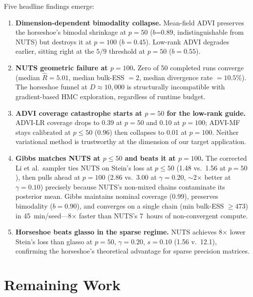 \documentclass[10pt,conference,compsoc]{IEEEtran}
\begin{document}
Five headline findings emerge:

\begin{enumerate}[leftmargin=*]
  \item \textbf{Dimension-dependent bimodality collapse.} Mean-field ADVI preserves the horseshoe's bimodal shrinkage at $p{=}50$ ($b$=$0.89$, indistinguishable from NUTS) but destroys it at $p{=}100$ ($b = 0.45$). Low-rank ADVI degrades earlier, sitting right at the $5/9$ threshold at $p{=}50$ ($b = 0.55$).

  \item \textbf{NUTS geometric failure at $p{=}100$.} Zero of 50 completed runs converge (median $\hat{R} = 5.01$, median bulk-ESS $= 2$, median divergence rate $= 10.5\%$). The horseshoe funnel at $D \approx 10{,}000$ is structurally incompatible with gradient-based HMC exploration, regardless of runtime budget.

  \item \textbf{ADVI coverage catastrophe starts at $p{=}50$ for the low-rank guide.} ADVI-LR coverage drops to 0.39 at $p{=}50$ and 0.10 at $p{=}100$; ADVI-MF stays calibrated at $p{\leq}50$ (0.96) then collapses to 0.01 at $p{=}100$. Neither variational method is trustworthy at the dimension of our target application.

  \item \textbf{Gibbs matches NUTS at $p{\leq}50$ and beats it at $p{=}100$.} The corrected Li et al.\ sampler ties NUTS on Stein's loss at $p{\leq}50$ (1.48 vs.\ 1.56 at $p{=}50$), then pulls ahead at $p{=}100$ (2.86 vs.\ 3.00 at $\gamma{=}0.20$, ${\sim}$2$\times$ better at $\gamma{=}0.10$) precisely because NUTS's non-mixed chains contaminate its posterior mean. Gibbs maintains nominal coverage (0.99), preserves bimodality ($b = 0.90$), and converges on a single chain (min bulk-ESS $\geq 473$) in 45~min/seed---8$\times$ faster than NUTS's 7~hours of non-convergent compute.

  \item \textbf{Horseshoe beats glasso in the sparse regime.} NUTS achieves 8$\times$ lower Stein's loss than glasso at $p{=}50$, $\gamma{=}0.20$, $s{=}0.10$ (1.56 v.\ 12.1), confirming the horseshoe's theoretical advantage for sparse precision matrices.
\end{enumerate}

\section{Remaining Work}
\end{document}
